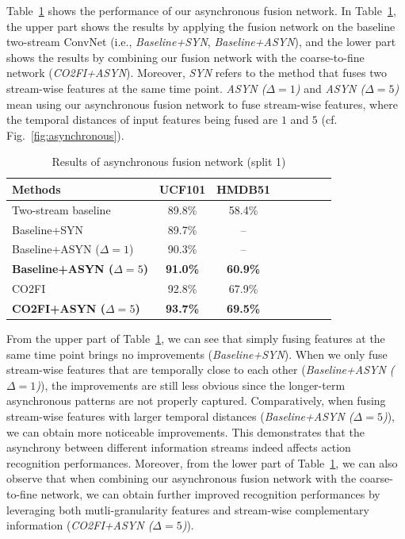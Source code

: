 \documentclass[letterpaper]{article}
\begin{document}
{Table~\ref{tab:cmcTable2} shows the performance of our asynchronous fusion network. In Table~\ref{tab:cmcTable2}, the upper part shows the results by applying the fusion network on the baseline two-stream ConvNet (i.e., \emph{Baseline+SYN}, \emph{Baseline+ASYN}), and the lower part shows the results by combining our fusion network with the coarse-to-fine network (\emph{CO2FI+ASYN}). Moreover, \emph{SYN} refers to the method that fuses two stream-wise features at the same time point. \emph{ASYN ($\Delta=1$)} and \emph{ASYN ($\Delta=5$)} mean using our asynchronous fusion network to fuse stream-wise features, where the temporal distances of input features being fused are $1$ and $5$ (cf. Fig.~\ref{fig:asynchronous}).



\begin{table}
\centering
\caption{Results of asynchronous fusion network (split 1) %
}\label{tab:cmcTable2}
\scriptsize{
\begin{adjustbox}{width=0.72\columnwidth}
\begin{tabular}{|p{4.5cm}|c|*{5}{c|}c}
\hline
\textbf{Methods}& UCF101& HMDB51 \\
\hline
Two-stream baseline &  89.8\%& 58.4\% \\%
Baseline+SYN & 89.7\%& --\\
Baseline+ASYN ($\Delta=1$) & 90.3\% & -- \\
{\bf Baseline+ASYN ($\Delta=5$)}&  {\bf 91.0\%} &{\bf 60.9\%}\\
\hline
CO2FI & 92.8\%& 67.9\%  \\
{\bf CO2FI+ASYN ($\Delta=5$)}& {\bf 93.7\%}& {\bf 69.5\%}  \\
\hline
\end{tabular}
\end{adjustbox}}
\end{table}



From the upper part of Table~\ref{tab:cmcTable2}, we can see that simply fusing features at the same time point brings no improvements (\emph{Baseline+SYN}). When we only fuse stream-wise features that are temporally close to each other (\emph{Baseline+ASYN ($\Delta=1$)}), the improvements are still less obvious since the longer-term asynchronous patterns are not properly captured. Comparatively, when fusing stream-wise features with larger temporal distances (\emph{Baseline+ASYN ($\Delta=5$)}), we can obtain more noticeable improvements. This demonstrates that the asynchrony between different information streams indeed affects action recognition performances. Moreover, from the lower part of Table~\ref{tab:cmcTable2}, we can also observe that when combining our asynchronous fusion network with the coarse-to-fine network, we can obtain further improved recognition performances by leveraging both mutli-granularity features and stream-wise complementary information (\emph{CO2FI+ASYN ($\Delta=5$)}).

}
\end{document}
